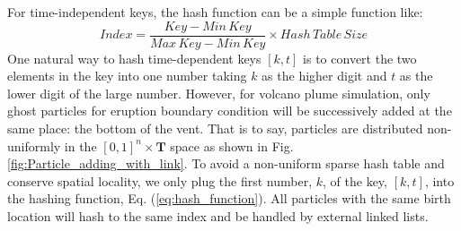 For time-independent keys, the hash function can be a simple function like:
\begin{equation}
Index= \frac{Key - Min\,Key}{Max\,Key - Min\,Key} 
\times Hash\,Table\,Size 
\label{eq:hash_function}
\end{equation}
One natural way to hash time-dependent keys $[k,t]$ is to convert the two elements in the key into one number taking $k$ as the higher digit and $t$ as the lower digit of the large number. However, for volcano plume simulation, only ghost particles for eruption boundary condition will be successively added at the same place: the bottom of the vent. That is to say, particles are distributed non-uniformly in the $[0,1]^n \times \textbf{T}$ space as shown in Fig. \ref{fig:Particle_adding_with_link}. To avoid a non-uniform sparse hash table and conserve spatial locality, we only plug the first number, $k$, of the key, $[k,t]$, into the hashing function, Eq. (\ref{eq:hash_function}). All particles with the same birth location will hash to the same index and be handled by external linked lists.
